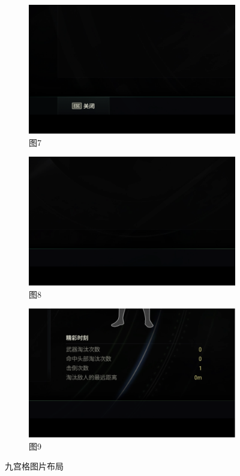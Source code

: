 \documentclass[12pt, a4paper, oneside]{ctexart}
\begin{document}
\begin{figure}[htbp]
    \medskip %

    \begin{subfigure}{0.3\textwidth}
        \centering
        \includegraphics[width=\textwidth]{fig/7.png} %
        \caption{图7}
    \end{subfigure}
    \hfill
    \begin{subfigure}{0.3\textwidth}
        \centering
        \includegraphics[width=\textwidth]{fig/8.png} %
        \caption{图8}
    \end{subfigure}
    \hfill
    \begin{subfigure}{0.3\textwidth}
        \centering
        \includegraphics[width=\textwidth]{fig/9.png} %
        \caption{图9}
    \end{subfigure}

    \caption{九宫格图片布局}
\end{figure}
\end{document}
